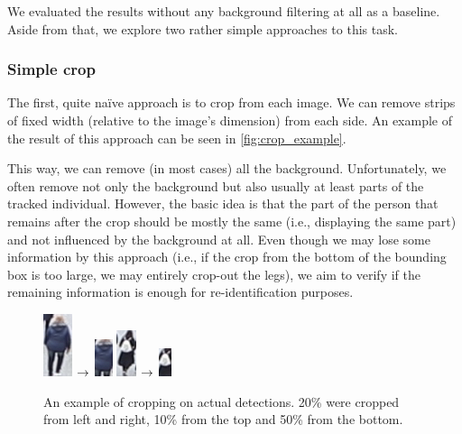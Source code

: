 We evaluated the results without any background filtering at all as a baseline. Aside from that, we explore two rather simple approaches to this task. 

\subsubsection{Simple crop}

The first, quite naïve approach is to crop from each image. We can remove strips of fixed width (relative to the image's dimension) from each side. An example of the result of this approach can be seen in \autoref{fig:crop_example}.

This way, we can remove (in most cases) all the background. Unfortunately, we often remove not only the background but also usually at least parts of the tracked individual. However, the basic idea is that the part of the person that remains after the crop should be mostly the same (i.e., displaying the same part) and not influenced by the background at all. Even though we may lose some information by this approach (i.e., if the crop from the bottom of the bounding box is too large, we may entirely crop-out the legs), we aim to verify if the remaining information is enough for re-identification purposes.

\begin{figure}
    \centering
    \includegraphics{img/background_filter/1_original.png} $\rightarrow$ \includegraphics{img/background_filter/1_small.png} \hspace{2cm} \includegraphics{img/background_filter/2_original.png} $\rightarrow$ \includegraphics{img/background_filter/2_small.png}
    \caption[An example of cropping on actual detections]{An example of cropping on actual detections. 20\% were cropped from left and right, 10\% from the top and 50\% from the bottom.}
    \label{fig:crop_example}
\end{figure}

